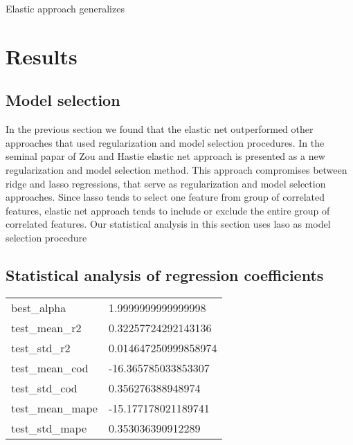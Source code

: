 \documentclass{article}
\begin{document}
Elastic approach generalizes 
\section{Results}

\subsection{Model selection}
In the  previous section we found that the elastic net outperformed other approaches that used regularization and model selection procedures. In the seminal papar of Zou and Hastie elastic net approach is presented as  a new regularization and model selection method. This approach compromises between ridge and lasso regressions, that serve as regularization and model selection approaches. Since lasso tends to select one feature from group of correlated features, elastic net approach tends to include or exclude the entire group of correlated features. Our statistical analysis in this section uses laso as model selection procedure 

\subsection{Statistical analysis of regression coefficients}
\begin{table}[!ht]
  \centering
  \begin{tabular}{|l|l|}
  \hline
      best\_alpha & 1.9999999999999998 \\
      test\_mean\_r2 & 0.32257724292143136 \\
      test\_std\_r2 & 0.014647250999858974 \\
      test\_mean\_cod & -16.365785033853307 \\
      test\_std\_cod & 0.356276388948974 \\
      test\_mean\_mape & -15.177178021189741 \\
      test\_std\_mape & 0.353036390912289 \\
  \end{tabular}
\end{table}


\printbibliography
\end{document}
